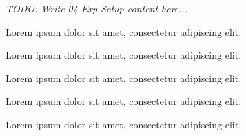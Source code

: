 \textit{TODO: Write 04 Exp Setup content here...}
\par Lorem ipsum dolor sit amet, consectetur adipiscing elit. \par Lorem ipsum dolor sit amet, consectetur adipiscing elit. \par Lorem ipsum dolor sit amet, consectetur adipiscing elit. \par Lorem ipsum dolor sit amet, consectetur adipiscing elit. \par Lorem ipsum dolor sit amet, consectetur adipiscing elit. 
